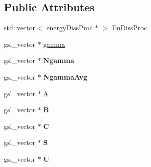 \subsection*{Public Attributes}
\begin{DoxyCompactItemize}
\item 
std\-::vector$<$ \hyperlink{classenergyDissProc}{energy\-Diss\-Proc} $\ast$ $>$ \hyperlink{classelectrons_a2c90bebdf0a961a720dc9b70306fb6ea}{En\-Diss\-Proc}
\item 
gsl\-\_\-vector $\ast$ \hyperlink{classelectrons_aba72b6575be27358efcb13cc3415df68}{gamma}
\item 
\hypertarget{classelectrons_ac2a11c35da2adfdf2f9ad915be55ca33}{gsl\-\_\-vector $\ast$ {\bfseries Ngamma}}\label{classelectrons_ac2a11c35da2adfdf2f9ad915be55ca33}

\item 
\hypertarget{classelectrons_aaea12887510456458b7a318edf62d4f0}{gsl\-\_\-vector $\ast$ {\bfseries Ngamma\-Avg}}\label{classelectrons_aaea12887510456458b7a318edf62d4f0}

\item 
gsl\-\_\-vector $\ast$ \hyperlink{classelectrons_a5d1c72cf1ee40f0e918fbb2d9d13393b}{A}
\item 
\hypertarget{classelectrons_a7ec0598cb033a2e77c2af1c5ef852658}{gsl\-\_\-vector $\ast$ {\bfseries B}}\label{classelectrons_a7ec0598cb033a2e77c2af1c5ef852658}

\item 
\hypertarget{classelectrons_ace04a2cb2a5ce764d53bb4a99461e709}{gsl\-\_\-vector $\ast$ {\bfseries C}}\label{classelectrons_ace04a2cb2a5ce764d53bb4a99461e709}

\item 
\hypertarget{classelectrons_ade5ba73efe54cddda0550d8de323e91d}{gsl\-\_\-vector $\ast$ {\bfseries S}}\label{classelectrons_ade5ba73efe54cddda0550d8de323e91d}

\item 
\hypertarget{classelectrons_afcef79a408b1a8f956573b85de8fb4ba}{gsl\-\_\-vector $\ast$ {\bfseries U}}\label{classelectrons_afcef79a408b1a8f956573b85de8fb4ba}

\end{DoxyCompactItemize}


